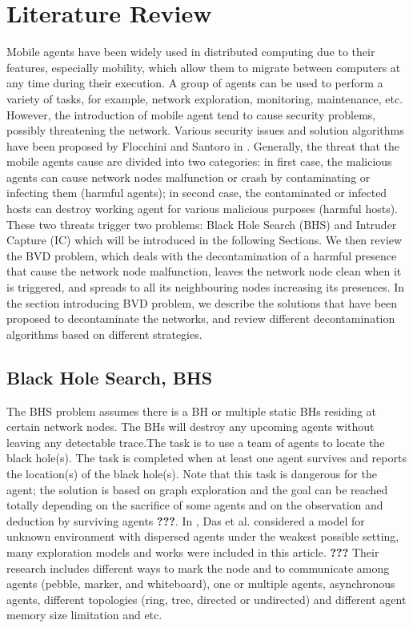 \chapter {Literature Review}
\label{RW}
Mobile agents have been widely used in  distributed computing due to their features, especially   mobility, which allow them to migrate between computers at any time during their execution. A group of agents can be used to perform a variety of tasks, for example, network exploration, monitoring,  maintenance,   etc. However, the introduction of mobile agent tend to cause security problems, possibly  threatening the network. Various security issues and solution algorithms have been proposed by Flocchini and Santoro in \cite{security}. Generally, the threat  that the mobile agents cause are divided into two categories: in first case, the malicious agents can cause network nodes malfunction or crash by contaminating or infecting them (harmful agents); in second case, the contaminated or infected hosts can destroy working agent for various malicious purposes (harmful hosts). These two threats trigger two problems: Black Hole Search (BHS) and Intruder Capture (IC) which will be introduced in the following Sections. We then  review the BVD problem, which deals with the decontamination of a harmful presence that cause the network node malfunction, leaves the network node clean when it is triggered, and spreads to all its neighbouring nodes increasing its presences. In the section introducing BVD problem, we describe the solutions that have been proposed to decontaminate the networks, and review different decontamination algorithms based on different strategies.

\section{Black Hole Search, BHS}
The BHS problem assumes there is a BH or multiple static BHs residing at certain network nodes. The BHs will destroy any upcoming agents without leaving any detectable trace.The task is to use a team of agents to locate the black hole(s). The task is completed when at least one agent survives and reports the location(s) of the black hole(s). Note that this task is dangerous for the agent;  the solution is based on graph exploration and the goal can be reached totally depending on the sacrifice of some agents and on the observation and deduction by surviving agents {\bf ???}.  In \cite{das}, Das et al. considered a model for unknown environment with dispersed agents under the weakest possible setting, many exploration models and works were included in this article. {\bf ???} Their research includes different ways to mark the node and to communicate among agents (pebble, marker, and whiteboard), one or multiple agents, asynchronous agents, different topologies (ring, tree, directed or undirected) and different agent memory size limitation and etc.

